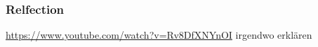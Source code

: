 \subsubsection{Relfection}\label{subsection:basic-}
\url{https://www.youtube.com/watch?v=Rv8DfXNYnOI}\newline
irgendwo erklären
